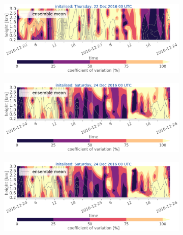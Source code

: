 \begin{figure}[t]\ContinuedFloat
		\begin{subfigure}[t]{\textwidth}		\includegraphics[trim={0.cm 5.3cm 0cm 0cm},clip,width=\textwidth]{./fig_variation/20161222}
			\caption{}\label{fig:ens_vari22}
		\end{subfigure}
		\begin{subfigure}[t]{\textwidth}		\includegraphics[trim={0.cm 5.3cm 0cm 0cm},clip,width=\textwidth]{./fig_variation/20161224}
			\caption{}\label{fig:ens_vari24}
		\end{subfigure}
        
     	\begin{subfigure}[t]{\textwidth}		\includegraphics[trim={15.cm 0cm 15cm 21cm},clip,width=\textwidth]{./fig_variation/20161224}
		\end{subfigure}
\end{figure}
